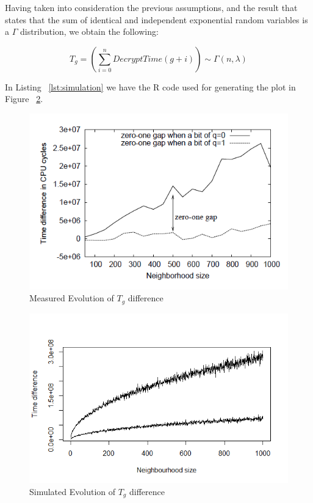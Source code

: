 \documentclass[a4paper,10pt,twocolumn,english]{article}
\begin{document}
Having taken into consideration the previous assumptions, and the result that states that the sum of identical and independent exponential random variables is a $\Gamma$ distribution, we obtain the following:

\[T_g=\left(\sum_{i=0}^{n} DecryptTime(g+i)\right) \sim \Gamma(n,\lambda)\] 



In Listing ~\ref*{lst:simulation} we have the R code used for generating the plot in Figure ~\ref*{fig:experiment1b_simulated}.

\begin{figure}[ht]
    \centering
    \includegraphics[width=0.9\linewidth]{ExpermimentArticol.png}
    \caption{Measured Evolution of $T_g$ difference}
    \label{fig:experiment1b_measured}
\end{figure}

\begin{figure}[ht]
    \centering
    \includegraphics[width=0.9\linewidth]{ExperimentSimulat.png}
    \caption{Simulated Evolution of $T_g$ difference}
    \label{fig:experiment1b_simulated}
\end{figure}
\end{document}
